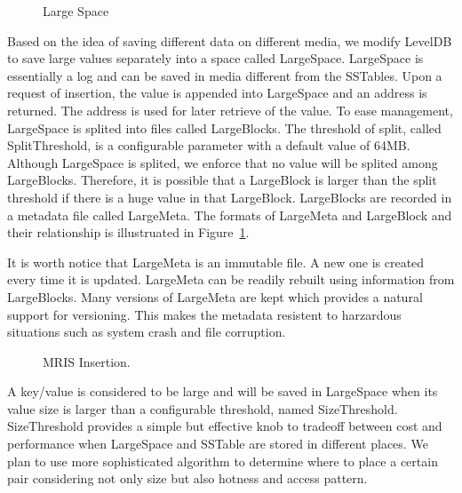 \begin{figure}[t]
\begin{centering}
\caption{Large Space}
\label{fig:space}
\end{centering}
\end{figure}

Based on the idea of saving different data on different media, we
modify LevelDB to save large values separately into a space called
LargeSpace. LargeSpace is essentially a log and can be saved in media
different from the SSTables. Upon a request of insertion, the value is
appended into LargeSpace and an address is returned. The address is
used for later retrieve of the value. To ease management, LargeSpace
is splited into files called LargeBlocks. The threshold of split,
called SplitThreshold, is a configurable parameter with a default
value of 64MB. Although LargeSpace is splited, we enforce that no
value will be splited among LargeBlocks. Therefore, it is possible
that a LargeBlock is larger than the split threshold if there is a
huge value in that LargeBlock.  LargeBlocks are recorded in a metadata
file called LargeMeta. The formats of LargeMeta and LargeBlock and
their relationship is illustruated in Figure~\ref{fig:space}.

It is worth notice that LargeMeta is an immutable file. A new one is
created every time it is updated. LargeMeta can be readily rebuilt
using information from LargeBlocks. Many versions of LargeMeta are
kept which provides a natural support for versioning. This makes the
metadata resistent to harzardous situations such as system crash and
file corruption.

\begin{figure}[t]
\begin{centering}
\caption{MRIS Insertion.}
\label{fig:mrisinsert}
\end{centering}
\end{figure}

A key/value is considered to be large and will be saved in LargeSpace
when its value size is larger than a configurable threshold, named
SizeThreshold. SizeThreshold provides a simple but effective knob to
tradeoff between cost and performance when LargeSpace and SSTable are
stored in different places. We plan to use more sophisticated
algorithm to determine where to place a certain pair considering not
only size but also hotness and access pattern.

